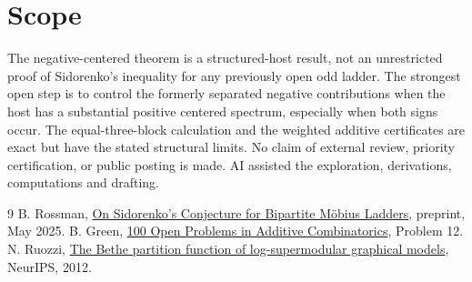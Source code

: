 \documentclass[11pt]{article}
\begin{document}
\section{Scope}
The negative-centered theorem is a structured-host result, not an unrestricted proof of Sidorenko's inequality for any previously open odd ladder. The strongest open step is to control the formerly separated negative contributions when the host has a substantial positive centered spectrum, especially when both signs occur. The equal-three-block calculation and the weighted additive certificates are exact but have the stated structural limits. No claim of external review, priority certification, or public posting is made. AI assisted the exploration, derivations, computations and drafting.

{\small
\begin{thebibliography}{9}
 B. Rossman, \href{https://users.cs.duke.edu/~br148/sidorenko-mobius.pdf}{On Sidorenko's Conjecture for Bipartite M\"obius Ladders}, preprint, May 2025.
 B. Green, \href{https://people.maths.ox.ac.uk/greenbj/papers/open-problems.pdf}{100 Open Problems in Additive Combinatorics}, Problem 12.
 N. Ruozzi, \href{https://arxiv.org/abs/1202.6035}{The Bethe partition function of log-supermodular graphical models}, NeurIPS, 2012.
\end{thebibliography}}
\end{document}
